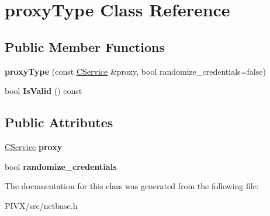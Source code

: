 \hypertarget{classproxy_type}{}\section{proxy\+Type Class Reference}
\label{classproxy_type}
\subsection*{Public Member Functions}
\begin{DoxyCompactItemize}
\item 
\mbox{\label{classproxy_type_ab628e8a0b5e97f2c9f43d24d341600da}} 
{\bfseries proxy\+Type} (const \mbox{\hyperlink{class_c_service}{C\+Service}} \&proxy, bool randomize\+\_\+credentials=false)
\item 
\mbox{\label{classproxy_type_a3f3c9c016b103c8ff5e61d115c188b36}} 
bool {\bfseries Is\+Valid} () const
\end{DoxyCompactItemize}
\subsection*{Public Attributes}
\begin{DoxyCompactItemize}
\item 
\mbox{\label{classproxy_type_a5bd2641d60e071671cbfe4f45e831743}} 
\mbox{\hyperlink{class_c_service}{C\+Service}} {\bfseries proxy}
\item 
\mbox{\label{classproxy_type_ad2539071d9857374f3cd3313a93bef55}} 
bool {\bfseries randomize\+\_\+credentials}
\end{DoxyCompactItemize}


The documentation for this class was generated from the following file\+:\begin{DoxyCompactItemize}
\item 
P\+I\+V\+X/src/netbase.\+h\end{DoxyCompactItemize}
